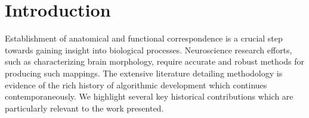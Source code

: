 \documentclass{frontiersSCNS}
\begin{document}
%
%
%







\section{Introduction}


Establishment of anatomical and functional correspondence is a crucial
step towards gaining insight into biological processes.
Neuroscience research efforts, such as characterizing brain
morphology, require accurate and robust methods for producing such
mappings.  The extensive literature detailing methodology is evidence
of the rich history of algorithmic development which continues
contemporaneously.  We highlight several key historical contributions
which are particularly relevant to the work presented.
\end{document}

